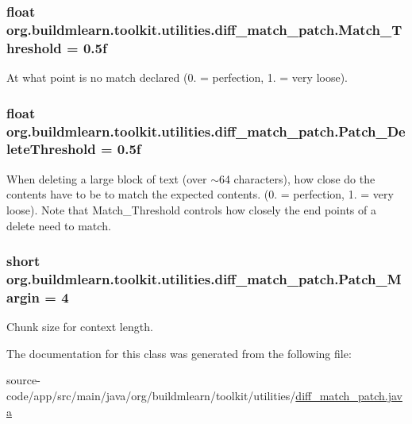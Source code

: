 \subsubsection[{\texorpdfstring{Match\+\_\+\+Threshold}{Match_Threshold}}]{\setlength{\rightskip}{0pt plus 5cm}float org.\+buildmlearn.\+toolkit.\+utilities.\+diff\+\_\+match\+\_\+patch.\+Match\+\_\+\+Threshold = 0.\+5f}\hypertarget{classorg_1_1buildmlearn_1_1toolkit_1_1utilities_1_1diff__match__patch_acf187fceb374f31164a5256fb3bc9990}{}\label{classorg_1_1buildmlearn_1_1toolkit_1_1utilities_1_1diff__match__patch_acf187fceb374f31164a5256fb3bc9990}
At what point is no match declared (0. = perfection, 1. = very loose). 
\subsubsection[{\texorpdfstring{Patch\+\_\+\+Delete\+Threshold}{Patch_DeleteThreshold}}]{\setlength{\rightskip}{0pt plus 5cm}float org.\+buildmlearn.\+toolkit.\+utilities.\+diff\+\_\+match\+\_\+patch.\+Patch\+\_\+\+Delete\+Threshold = 0.\+5f}\hypertarget{classorg_1_1buildmlearn_1_1toolkit_1_1utilities_1_1diff__match__patch_a08c885bb96f00082195af6c8a4abf5b4}{}\label{classorg_1_1buildmlearn_1_1toolkit_1_1utilities_1_1diff__match__patch_a08c885bb96f00082195af6c8a4abf5b4}
When deleting a large block of text (over $\sim$64 characters), how close do the contents have to be to match the expected contents. (0. = perfection, 1. = very loose). Note that Match\+\_\+\+Threshold controls how closely the end points of a delete need to match. 
\subsubsection[{\texorpdfstring{Patch\+\_\+\+Margin}{Patch_Margin}}]{\setlength{\rightskip}{0pt plus 5cm}short org.\+buildmlearn.\+toolkit.\+utilities.\+diff\+\_\+match\+\_\+patch.\+Patch\+\_\+\+Margin = 4}\hypertarget{classorg_1_1buildmlearn_1_1toolkit_1_1utilities_1_1diff__match__patch_a94f96bf3e770fd823e638f97fc51962a}{}\label{classorg_1_1buildmlearn_1_1toolkit_1_1utilities_1_1diff__match__patch_a94f96bf3e770fd823e638f97fc51962a}
Chunk size for context length. 

The documentation for this class was generated from the following file\+:\begin{DoxyCompactItemize}
\item 
source-\/code/app/src/main/java/org/buildmlearn/toolkit/utilities/\hyperlink{diff__match__patch_8java}{diff\+\_\+match\+\_\+patch.\+java}\end{DoxyCompactItemize}

